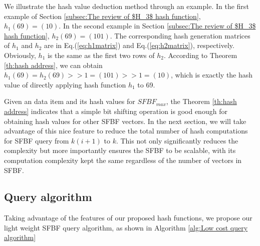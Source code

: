 \documentclass[10pt,journal,letterpaper]{IEEEtran}
\begin{document}
We illustrate the hash value deduction method through an example. In the first example of Section \ref{subsec:The review of $H_3$ hash function}, $h_1(69)=(10)$. In the second example in Section \ref{subsec:The review of $H_3$ hash function}, $h_2(69)=(101)$. The corresponding hash generation matrices of $h_1$ and $h_2$ are in Eq.(\ref{eq:h1matrix}) and Eq.(\ref{eq:h2matrix}), respectively. Obviously, $h_1$ is the same as the first two rows of $h_2$. According to Theorem \ref{th:hash address}, we can obtain $h_1(69)=h_2(69)>>1=(101)>>1=(10)$, which is exactly the hash value of directly applying hash function $h_1$ to 69.

Given an data item and its hash values for $SFBF_{max}$, the Theorem \ref{th:hash address} indicates that a simple
bit shifting operation is good enough for obtaining hash values for other SFBF vectors.
In the next section, we will take advantage of this nice feature  to reduce the total number of hash computations for SFBF query from $k(i+1)$ to $k$. This not only significantly reduces the complexity but more importantly ensures the SFBF to be scalable, with its computation complexity kept the same regardless of the number of vectors in SFBF.
\subsection{Query algorithm}
%

Taking advantage of the features of our proposed hash
functions, we propose our light weight SFBF query algorithm, as shown in Algorithm \ref{alg:Low cost query algorithm}
\end{document}
